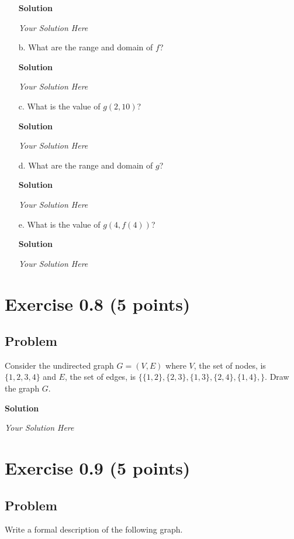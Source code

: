 \documentclass{article}
\begin{document}
\begin{empfile}
\begin{itemize}
\textbf{Solution}

\emph{Your Solution Here}

\item[b.] What are the range and domain of $f$?

\textbf{Solution}

\emph{Your Solution Here}

\item[c.] What is the value of $g(2, 10)$?

\textbf{Solution}

\emph{Your Solution Here}

\item[d.] What are the range and domain of $g$?

\textbf{Solution}

\emph{Your Solution Here}

\item[e.] What is the value of $g(4, f(4))$?

\textbf{Solution}

\emph{Your Solution Here}

\end{itemize}

\section*{Exercise 0.8 (5 points)}

\subsection*{Problem}

Consider the undirected graph $G = (V, E)$ where $V$, the set of nodes, is $\{ 1, 2, 3, 4 \}$ and $E$, the
set of edges, is $\{ \{ 1, 2 \}, \{ 2, 3 \}, \{ 1, 3 \}, \{ 2, 4 \}, \{ 1, 4 \}, \}$.  Draw the graph
$G$.

\textbf{Solution}

\emph{Your Solution Here}

\section*{Exercise 0.9 (5 points)}

\subsection*{Problem}

Write a formal description of the following graph.


\end{empfile}
\end{document}
